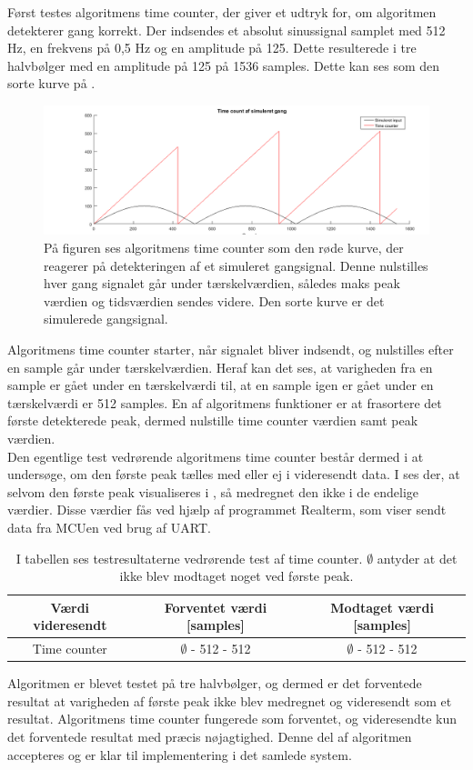 Først testes algoritmens time counter, der giver et udtryk for, om algoritmen detekterer gang korrekt. Der indsendes et absolut sinussignal samplet med 512 Hz, en frekvens på 0,5 Hz og en amplitude på 125. Dette resulterede i tre halvbølger med en amplitude på 125 på 1536 samples. Dette kan ses som den sorte kurve på .
\begin{figure}[H]
	\centering
	\includegraphics[scale=0.3]{figures/cDesign/test_timecount_gang.png}
	\caption{På figuren ses algoritmens time counter som den røde kurve, der reagerer på detekteringen af et simuleret gangsignal. Denne nulstilles hver gang signalet går under tærskelværdien, således maks peak værdien og tidsværdien sendes videre. Den sorte kurve er det simulerede gangsignal.}
	\label{fig:testgraf_timecounter}
\end{figure}
Algoritmens time counter starter, når signalet bliver indsendt, og nulstilles efter en sample går under tærskelværdien. Heraf kan det ses, at varigheden fra en sample er gået under en tærskelværdi til, at en sample igen er gået under en tærskelværdi er 512 samples. En af algoritmens funktioner er at frasortere det første detekterede peak, dermed nulstille time counter værdien samt peak værdien.\\
Den egentlige test vedrørende algoritmens time counter består dermed i at undersøge, om den første peak tælles med eller ej i videresendt data. I  ses der, at selvom den første peak visualiseres i , så medregnet den ikke i de endelige værdier. Disse værdier fås ved hjælp af programmet Realterm, som viser sendt data fra MCUen ved brug af UART.
\begin{table}[H]
	\centering
	\begin{tabular}{ccc}
		\hline
		\rowcolor[HTML]{C0C0C0} 
		Værdi videresendt & Forventet værdi [samples] & Modtaget værdi [samples] \\ \hline
		Time counter & $\emptyset$ - 512 - 512 & $\emptyset$ - 512 - 512 \\ \hline
	\end{tabular}
	\caption{I tabellen ses testresultaterne vedrørende test af time counter. $\emptyset$ antyder at det ikke blev modtaget noget ved første peak.}
	\label{tab:test_res_timecount}
\end{table} \vspace{-0.5cm}
Algoritmen er blevet testet på tre halvbølger, og dermed er det forventede resultat at varigheden af første peak ikke blev medregnet og videresendt som et resultat. Algoritmens time counter fungerede som forventet, og videresendte kun det forventede resultat med præcis nøjagtighed. Denne del af algoritmen accepteres og er klar til implementering i det samlede system.

